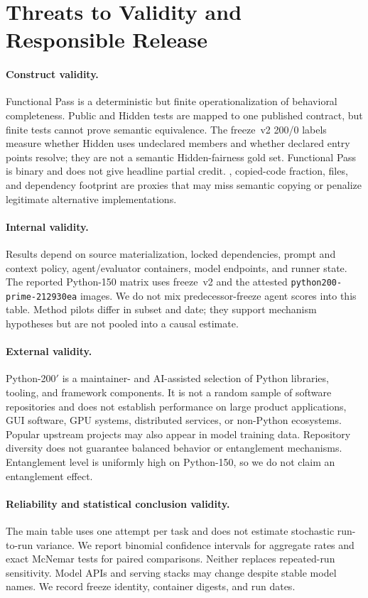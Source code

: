 \section{Threats to Validity and Responsible Release}
\label{sec:threats}

\paragraph{Construct validity.}
Functional Pass is a deterministic but finite operationalization of behavioral
completeness. Public and Hidden tests are mapped to one published contract, but
finite tests cannot prove semantic equivalence. The freeze~v2 200/0 labels
measure whether Hidden uses undeclared members and whether declared entry
points resolve; they are not a semantic Hidden-fairness gold set. Functional
Pass is binary and does not give headline partial credit. \rres, copied-code
fraction, files, and dependency footprint are proxies that may miss semantic
copying or penalize legitimate alternative implementations.

\paragraph{Internal validity.}
Results depend on source materialization, locked dependencies, prompt and
context policy, agent/evaluator containers, model endpoints, and runner state.
The reported Python-150 matrix uses freeze~v2 and the attested
\texttt{python200-prime-212930ea} images. We do not mix predecessor-freeze
agent scores into this table. Method pilots differ in subset and date; they
support mechanism hypotheses but are not pooled into a causal estimate.

\paragraph{External validity.}
Python-200$'$ is a maintainer- and AI-assisted selection of Python libraries,
tooling, and framework components. It is not a random sample of software
repositories and does not establish performance on large product applications,
GUI software, GPU systems, distributed services, or non-Python ecosystems.
Popular upstream projects may also appear in model training data. Repository
diversity does not guarantee balanced behavior or entanglement mechanisms.
Entanglement level is uniformly high on Python-150, so we do not claim an
entanglement effect.

\paragraph{Reliability and statistical conclusion validity.}
The main table uses one attempt per task and does not estimate stochastic
run-to-run variance. We report binomial confidence intervals for aggregate
rates and exact McNemar tests for paired comparisons. Neither replaces
repeated-run sensitivity. Model APIs and serving stacks may change despite
stable model names. We record freeze identity, container digests, and run
dates.

